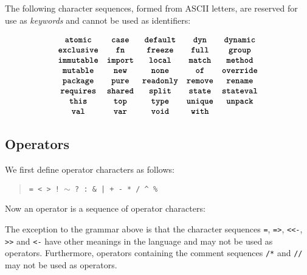 The following character sequences, formed from ASCII letters, are reserved
for use as \textit{keywords} and cannot be used as identifiers:

\begin{quote}
 \oneof 
\end{quote}
\[
  \begin{array}{cccccc}
  \texttt{\textbf{atomic}}
  & \texttt{\textbf{case}} 
  & \texttt{\textbf{default}}
  & \texttt{\textbf{dyn}} 
  & \texttt{\textbf{dynamic}}
  \\
  \texttt{\textbf{exclusive}} 
  & \texttt{\textbf{fn}}
  & \texttt{\textbf{freeze}}
  & \texttt{\textbf{full}} 
  & \texttt{\textbf{group}}  
  \\
  \texttt{\textbf{immutable}}
  & \texttt{\textbf{import}}
  & \texttt{\textbf{local}}
  & \texttt{\textbf{match}}
  & \texttt{\textbf{method}}
  \\
  \texttt{\textbf{mutable}}
  &\texttt{\textbf{new}}
  & \texttt{\textbf{none}}
  & \texttt{\textbf{of}}
  & \texttt{\textbf{override}} 
  \\
  \texttt{\textbf{package}}
  & \texttt{\textbf{pure}}
  & \texttt{\textbf{readonly}}
  & \texttt{\textbf{remove}}
  & \texttt{\textbf{rename}}
  \\
  \texttt{\textbf{requires}}
  &\texttt{\textbf{shared}}
  & \texttt{\textbf{split}}  
  & \texttt{\textbf{state}}
  & \texttt{\textbf{stateval}}
  \\
   \texttt{\textbf{this}}
  & \texttt{\textbf{top}}
  & \texttt{\textbf{type}} 
  & \texttt{\textbf{unique}} 
  & \texttt{\textbf{unpack}}
  \\  \texttt{\textbf{val}}
  &\texttt{\textbf{var}}
  &\texttt{\textbf{void}}
  &\texttt{\textbf{with}}
  \end{array}
\]







\subsection{Operators}

We first define operator characters as follows:

\begin{quote}

 \oneof

 \texttt{= < > ! $\sim$ ? : \& | + - * / \^{} \%}

\end{quote}

Now an operator is a sequence of operator characters:

\begin{quote}


 {}

 {} 

\end{quote}

The exception to the grammar above is that the character sequences
\texttt{=}, \texttt{=>}, \texttt{<<-}, \texttt{>>} and \texttt{<-} have
other meanings in the language and may not be used as operators.
Furthermore, operators containing the comment sequences \texttt{/*}
and \texttt{//} may not be used as operators.
